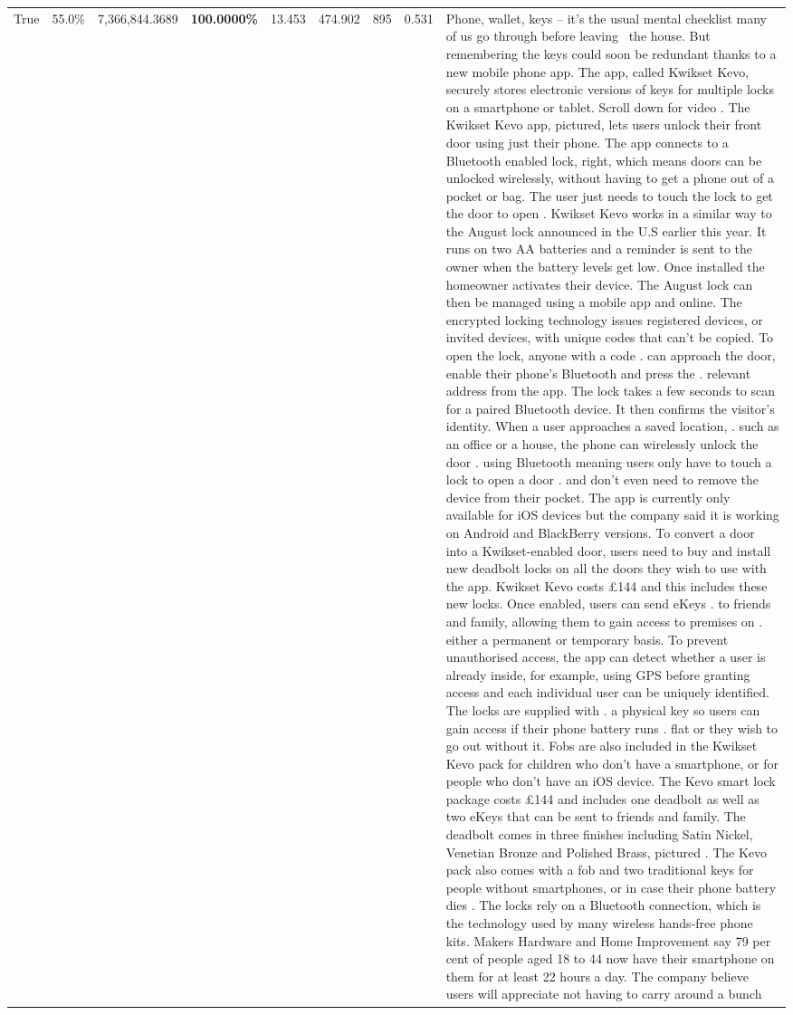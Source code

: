 \begin{table}[H]
\begin{tabular}{lllrlllll}
True & 55.0\% & 7,366,844.3689 & \bfseries \color{red} 100.0000\% & 13.453 & 474.902 & 895 & 0.531 & Phone, wallet, keys – it’s the usual mental checklist many of us go through before leaving  the house. But remembering the keys could soon be redundant thanks to a new mobile phone app. The app, called Kwikset Kevo, securely stores electronic versions of keys for multiple locks on a smartphone or tablet. Scroll down for video . The Kwikset Kevo app, pictured, lets users unlock their front door using just their phone. The app connects to a Bluetooth enabled lock, right, which means doors can be unlocked wirelessly, without having to get a phone out of a pocket or bag. The user just needs to touch the lock to get the door to open . Kwikset Kevo works in a similar way to the August lock announced in the U.S earlier this year. It runs on two AA batteries and a reminder is sent to the owner when the battery levels get low. Once installed the homeowner activates their device. The August lock can then be managed using a mobile app and online. The encrypted locking technology issues registered devices, or invited devices, with unique codes that can't be copied. To open the lock, anyone with a code . can approach the door, enable their phone's Bluetooth and press the . relevant address from the app. The lock takes a few seconds to scan for a paired Bluetooth device. It then confirms the visitor's identity. When a user approaches a saved location, . such as an office or a house, the phone can wirelessly unlock the door . using Bluetooth meaning users only have to touch a lock to open a door . and don't even need to remove the device from their pocket. The app is currently only available for iOS devices but the company said it is working on Android and BlackBerry versions. To convert a door into a Kwikset-enabled door, users need to buy and install new deadbolt locks on all the doors they wish to use with the app. Kwikset Kevo costs £144 and this includes these new locks. Once enabled, users can send eKeys . to friends and family, allowing them to gain access to premises on . either a permanent or temporary basis. To prevent unauthorised access, the app can detect whether a user is already inside, for example, using GPS before granting access and each individual user can be uniquely identified. The locks are supplied with . a physical key so users can gain access if their phone battery runs . flat or they wish to go out without it. Fobs are also included in the Kwikset Kevo pack for children who don't have a smartphone, or for people who don't have an iOS device. The Kevo smart lock package costs £144 and includes one deadbolt as well as two eKeys that can be sent to friends and family. The deadbolt comes in three finishes including Satin Nickel, Venetian Bronze and Polished Brass, pictured . The Kevo pack also comes with a fob and two traditional keys for people without smartphones, or in case their phone battery dies . The locks rely on a Bluetooth connection, which is the technology used by many wireless hands-free phone kits. Makers Hardware and Home Improvement say 79 per cent of people aged 18 to 44 now have their smartphone on them for at least 22 hours a day. The company believe users will appreciate not having to carry around a bunch 
\end{tabular}
\end{table}
